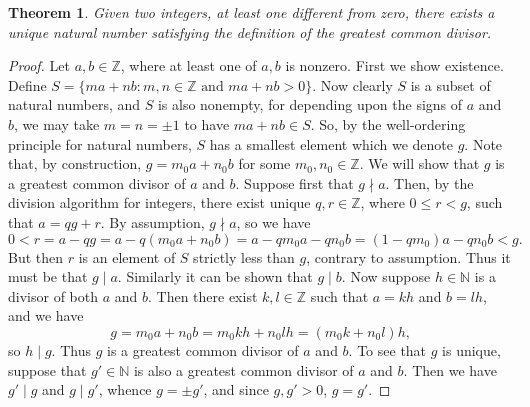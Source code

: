 \documentclass[12pt]{article}
\theoremstyle{plain}
\newtheorem*{thm}{Theorem}
\begin{document}
\begin{thm}
Given two integers, at least one different from zero, there exists a unique natural number satisfying the definition of the greatest common divisor. 
\end{thm}
\begin{proof}
Let $a,b\in\mathbb{Z}$, where at least one of $a,b$ is nonzero. First we show existence. Define 
$S=\{ma+nb:m,n\in\mathbb{Z}\text{ and }ma+nb>0\}$. Now clearly $S$ is a subset of natural numbers, and $S$ is also nonempty, for depending upon the signs of $a$ and $b$, we may take $m=n=\pm 1$ to have $ma+nb\in S$. So, by the well-ordering principle for natural numbers, $S$ has a smallest element which we denote $g$.
Note that, by construction, $g=m_0a+n_0b$ for some $m_0,n_0\in\mathbb{Z}$. We will show that $g$ is a greatest common divisor of $a$ and $b$. Suppose first that $g\nmid a$. Then, by the division algorithm for integers, there exist unique $q,r\in\mathbb{Z}$, where $0\leq r< g$, such that $a=qg+r$. By assumption, $g\nmid a$, so we have
\begin{equation*}
0<r=a-qg=a-q(m_0a+n_0b)=a-qm_0a-qn_0b=(1-qm_0)a-qn_0b<g\text{.}
\end{equation*}
But then $r$ is an element of $S$ strictly less than $g$, contrary to assumption. Thus it must be that $g\mid a$. Similarly it can be shown that $g\mid b$. Now suppose $h\in\mathbb{N}$ is a divisor of both $a$ and $b$. Then there exist $k,l\in\mathbb{Z}$ such that $a=kh$ and $b=lh$, and we have
\begin{equation*}
g=m_0a+n_0b=m_0kh+n_0lh=(m_0k+n_0l)h\text{,}
\end{equation*}
so $h\mid g$. 
Thus $g$ is a greatest common divisor of $a$ and $b$. To see that $g$ is unique, suppose that $g'\in\mathbb{N}$ is also a greatest common divisor of $a$ and $b$. Then we have $g'\mid g$ and $g\mid g'$, whence $g=\pm g'$, and since $g,g'>0$, $g=g'$. 
\end{proof}
\end{document}
